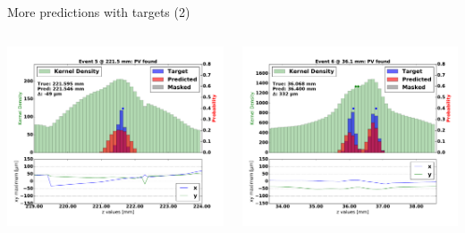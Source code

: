 \begin{frame}{More predictions with targets (2)}
  \begin{columns}[c]
        \begin{center}
           \includegraphics[width=1\textwidth, trim=60 0 60 0]{images/07Jan19_AltCNN4Layer_D35_sp_31.pdf}
        \end{center}
        \begin{center}
           \includegraphics[width=1\textwidth, trim=60 0 60 0]{images/07Jan19_AltCNN4Layer_D35_sp_32.pdf}
       \end{center}
  \end{columns}
\end{frame}


